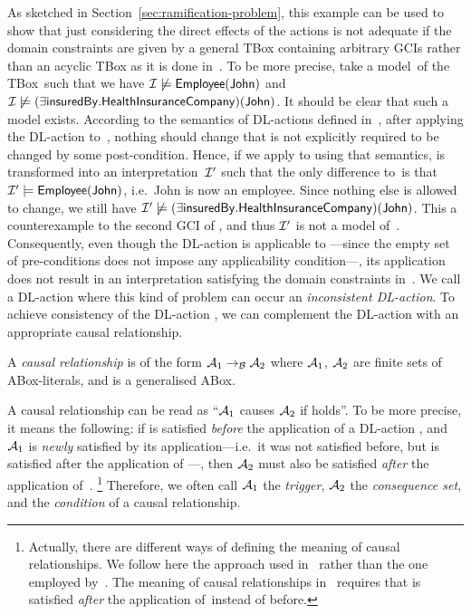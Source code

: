 \noindent
As sketched in Section~\ref{sec:ramification-problem}, this example can be used
to show that just considering the direct effects of the actions is not adequate
if the domain constraints are given by a general TBox containing arbitrary GCIs
rather than an acyclic TBox as it is done in~\cite{BLM+-AAAI05}.  To be more
precise, take a model~\Imc of the TBox~\Tmc such that we have
$\mathcal{I}\not\models\mathsf{Employee}(\mathsf{John})$ and
$\mathcal{I}\not\models(\exists\mathsf{insuredBy}.\mathsf{HealthInsuranceCompany})(\mathsf{John})$.  It should be clear that such a
model exists.  According to the semantics of DL-actions defined
in~\cite{BLM+-AAAI05}, after applying the DL-action \HireJohn to~\Imc, nothing
should change that is not explicitly required to be changed by some
post-condition.  Hence, if we apply \HireJohn to \Imc using that semantics, \Imc
is transformed into an interpretation~$\mathcal{I}'$ such that the only difference
to~\Imc is that $\mathcal{I}'\models\mathsf{Employee}(\mathsf{John})$, i.e.~John is now an employee.
Since nothing else is allowed to change, we still have
$\mathcal{I}'\not\models(\exists\mathsf{insuredBy}.\mathsf{HealthInsuranceCompany})(\mathsf{John})$.  This a counterexample to the
second GCI of \Tmc, and thus $\mathcal{I}'$ is not a model of~\Tmc.  Consequently, even
though the DL-action \HireJohn is applicable to \Imc---since the empty set of
pre-conditions does not impose any applicability condition---, its application
does not result in an interpretation satisfying the domain constraints in~\Tmc.
%
We call a DL-action where this kind of problem can occur an \emph{inconsistent
DL-action}.  To achieve consistency of the DL-action \HireJohn, we can
complement the DL-action with an appropriate causal relationship.

\begin{definition}\label{def:cr}
    A \emph{causal relationship} is of the form $\mathcal{A}_1\to_{\mathcal{B}}\mathcal{A}_2$
    where $\mathcal{A}_1$, $\mathcal{A}_2$ are finite sets of ABox-literals, and \Bmc is a
    generalised ABox.
\end{definition}

\noindent
A causal relationship can be read as \enquote{$\mathcal{A}_1$ causes $\mathcal{A}_2$ if \Bmc
holds}.  To be more precise, it means the following: if \Bmc is satisfied
\emph{before} the application of a DL-action \abf, and $\mathcal{A}_1$ is \emph{newly}
satisfied by its application---i.e.~it was not satisfied before, but is
satisfied after the application of \abf---, then $\mathcal{A}_2$ must also be satisfied
\emph{after} the application of~\abf.%
\footnote{Actually, there are different ways of defining the meaning of causal
    relationships.  We follow here the approach used
    in~\cite{BeDT-ESSLLI98,DeTB-LEACIS98} rather than the one employed
    by~\cite{Lin-IJCAI95,Thi-AIJ97}.  The meaning of causal relationships
    in~\cite{Lin-IJCAI95,Thi-AIJ97} requires that \Bmc is satisfied
    \emph{after} the application of~\abf instead of before.}
Therefore, we often call $\mathcal{A}_1$ the \emph{trigger}, $\mathcal{A}_2$ the
\emph{consequence set}, and \Bmc the \emph{condition} of a causal relationship.

